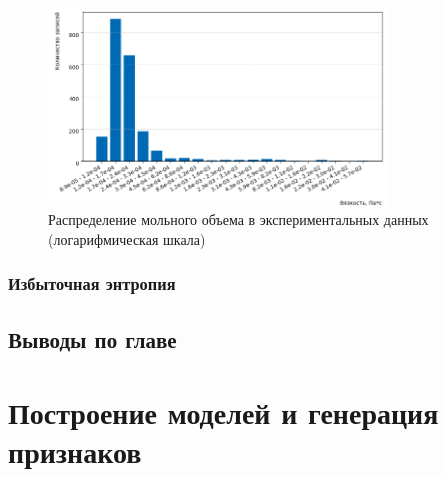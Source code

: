 \documentclass[a4paper,12pt]{article}
\begin{document}
      \begin{figure}[ht!]
          \centering
          \includegraphics[width=0.8\textwidth]{data_distribution_molar_volume.png}
          \caption{Распределение мольного объема в экспериментальных данных (логарифмическая шкала)}
          \label{fig:data_distribution_molar_volume}
      \end{figure}

    \subsubsection{Избыточная энтропия}


% 
% 


  \subsection{Выводы по главе}
\newpage

\section{Построение моделей и генерация признаков}
\end{document}
